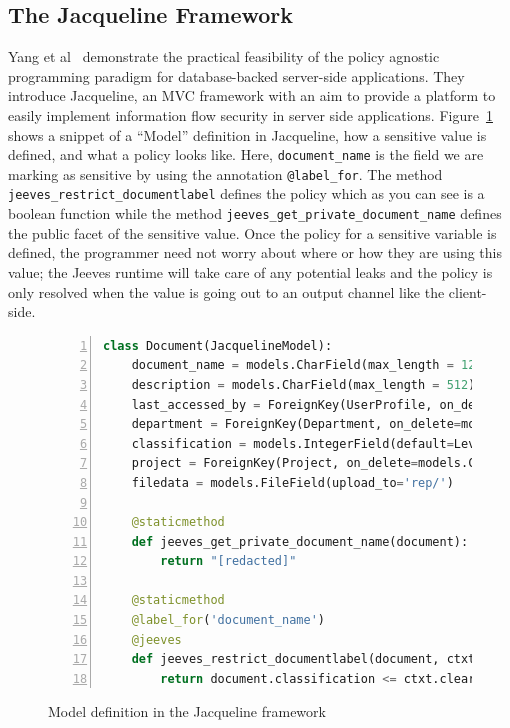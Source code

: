 \subsection{The Jacqueline Framework \label{sec:Jacqueline}}
Yang et al~\cite{Jacqueline} demonstrate the practical feasibility of the policy
agnostic programming paradigm for database-backed server-side applications.
They introduce Jacqueline, an MVC framework with an aim to provide a platform to
easily implement information flow security in server side applications. Figure~\ref{fig:DRS}
shows a snippet of a ``Model'' definition in Jacqueline, how a sensitive value is
defined, and what a policy looks like. Here, \texttt{document\_name} is the field
we are marking as sensitive by using the annotation \texttt{@label\_for}. The method
\texttt{jeeves\_restrict\_documentlabel} defines the policy which as you can see
is a boolean function while the method \texttt{jeeves\_get\_private\_document\_name}
defines the public facet of the sensitive value. Once the policy for a sensitive
variable is defined, the programmer need not worry about where or how they are
using this value; the Jeeves runtime will take care of any potential leaks and the
policy is only resolved when the value is going out to an output channel like the
client-side.

\begin{figure}
\begin{lstlisting}[language=Python, frame=single, breaklines=true, keywordstyle=\color{keywords}, stringstyle=\color{red}, identifierstyle=\color{darkgray}, procnamekeys={def,class}, basicstyle=\footnotesize\ttfamily, numbers=left, extendedchars=true, tabsize=2]
class Document(JacquelineModel):
    document_name = models.CharField(max_length = 128)
    description = models.CharField(max_length = 512)
    last_accessed_by = ForeignKey(UserProfile, on_delete=models.CASCADE)
    department = ForeignKey(Department, on_delete=models.CASCADE)
    classification = models.IntegerField(default=Levels.TOP_SECRET)
    project = ForeignKey(Project, on_delete=models.CASCADE)
    filedata = models.FileField(upload_to='rep/')

    @staticmethod
    def jeeves_get_private_document_name(document):
        return "[redacted]"

    @staticmethod
    @label_for('document_name')
    @jeeves
    def jeeves_restrict_documentlabel(document, ctxt):
        return document.classification <= ctxt.clearance and document.department == ctxt.department
\end{lstlisting}
\caption{Model definition in the Jacqueline framework}
\label{fig:DRS}
\end{figure}


